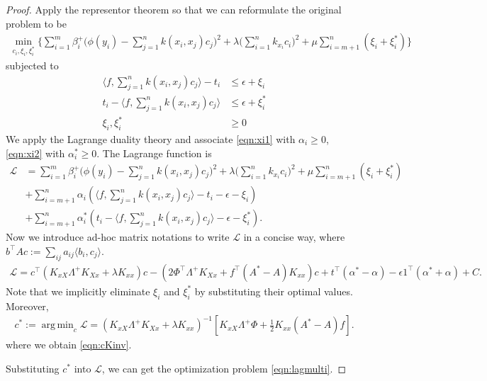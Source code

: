 \documentclass[a4paper]{article}
\renewcommand{\cal}{\mathcal}
\newcommand{\T}{\intercal}
\DeclareMathOperator*{\argmin}{arg\,min}
\begin{document}
\begin{proof}
Apply the representor theorem so that we can reformulate the original problem to be
\begin{align}
\min_{c_i,\xi_i,\xi_i^*}\bigg\{ \sum_{i=1}^m \beta_i^+ \bigg(\phi(y_i) - \sum_{j=1}^{n} k(x_i,x_j)c_j\bigg)^2 + \lambda\bigg(\sum_{i=1}^{n} k_{x_i}c_i\bigg)^2 + \mu \sum_{i=m+1}^{n} (\xi_i + \xi^*_i) \bigg\}
\end{align}
subjected to
\begin{align}
\langle f, \sum_{j=1}^{n} k(x_i,x_j)c_j \rangle - t_i &\leq \epsilon + \xi_i \label{eqn:xi1}\\
t_i - \langle f,\sum_{j=1}^{n} k(x_i,x_j)c_j \rangle &\leq \epsilon + \xi_i^*\label{eqn:xi2}\\
\xi_i, \xi_i^* &\geq 0
\end{align}
We apply the Lagrange duality theory \cite{boyd2004convex} and associate \eqref{eqn:xi1} with $\alpha_i \geq 0$, \eqref{eqn:xi2} with $\alpha_i^* \geq 0$. The Lagrange function is
\begin{align*}
 \cal{L} &= \sum_{i=1}^m \beta_i^+ \bigg(\phi(y_i) - \sum_{j=1}^{n} k(x_i,x_j)c_j\bigg)^2 + \lambda\bigg(\sum_{i=1}^{n} k_{x_i}c_i\bigg)^2 + \mu \sum_{i=m+1}^{n} (\xi_i + \xi^*_i)\\
 &+ \sum_{i=m+1}^{n} \alpha_i (\langle f,\sum_{j=1}^{n} k(x_i,x_j)c_j \rangle - t_i - \epsilon -\xi_i)\\
 &+ \sum_{i=m+1}^{n} \alpha_i^* (t_i - \langle f,\sum_{j=1}^{n} k(x_i,x_j)c_j \rangle - \epsilon - \xi_i^*).
\end{align*}
Now we introduce ad-hoc matrix notations to write $\cal{L}$ in a concise way, where $b^\T A c := \sum_{ij} a_{ij}\langle b_i,c_j\rangle$.
\begin{align}
\cal{L} = c^\T (K_{xX}\Lambda^+ K_{Xx} + \lambda K_{xx})c - (2\Phi^\T \Lambda^+ K_{Xx} + f^\T(A^*-A)K_{xx})c + t^\T (\alpha^* - \alpha) - \epsilon 1^\T (\alpha^* + \alpha) + C.
\end{align}
Note that we implicitly eliminate $\xi_i$ and $\xi_i^*$ by substituting their optimal values. Moreover,
\begin{align}
c^* := \argmin_c \cal{L} = (K_{xX}\Lambda^+K_{Xx}+\lambda K_{xx})^{-1}\left[K_{xX}\Lambda^+ \Phi + \frac{1}{2}K_{xx}(A^*-A)f\right].
\end{align}
where we obtain \eqref{eqn:cKinv}.

Substituting $c^*$ into $\cal{L}$, we can get the optimization problem \eqref{eqn:lagmulti}. 
\end{proof}
\end{document}
